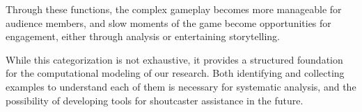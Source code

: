 \medskip

Through these functions, the complex gameplay becomes more manageable for audience members, and slow moments of the game become opportunities for engagement, either through analysis or entertaining storytelling. 

\medskip

While this categorization is not exhaustive, it provides a structured foundation for the computational modeling of our research. Both identifying and collecting examples to understand each of them is necessary for systematic analysis, and the possibility of developing tools for shoutcaster assistance in the future. 